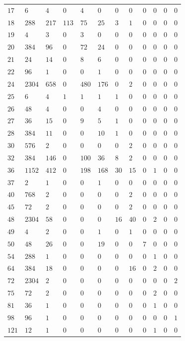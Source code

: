\documentclass[12pt]{amsart}
\numberwithin{equation}{section}
\theoremstyle{plain}
\theoremstyle{definition}
\theoremstyle{remark}
\begin{document}
\begin{longtable}{llllllllllll}
$17$ & $6$ & $4$ & $0$ & $4$ & $0$ & $0$ & $0$ & $0$ & $0$ & $0$ & $0$\\
$18$ & $288$ & $217$ & $113$ & $75$ & $25$ & $3$ & $1$ & $0$ & $0$ & $0$ & $0$\\
$19$ & $4$ & $3$ & $0$ & $3$ & $0$ & $0$ & $0$ & $0$ & $0$ & $0$ & $0$\\
$20$ & $384$ & $96$ & $0$ & $72$ & $24$ & $0$ & $0$ & $0$ & $0$ & $0$ & $0$\\
$21$ & $24$ & $14$ & $0$ & $8$ & $6$ & $0$ & $0$ & $0$ & $0$ & $0$ & $0$\\
$22$ & $96$ & $1$ & $0$ & $0$ & $1$ & $0$ & $0$ & $0$ & $0$ & $0$ & $0$\\
$24$ & $2304$ & $658$ & $0$ & $480$ & $176$ & $0$ & $2$ & $0$ & $0$ & $0$ & $0$\\
$25$ & $6$ & $4$ & $1$ & $1$ & $1$ & $1$ & $0$ & $0$ & $0$ & $0$ & $0$\\
$26$ & $48$ & $4$ & $0$ & $0$ & $4$ & $0$ & $0$ & $0$ & $0$ & $0$ & $0$\\
$27$ & $36$ & $15$ & $0$ & $9$ & $5$ & $1$ & $0$ & $0$ & $0$ & $0$ & $0$\\
$28$ & $384$ & $11$ & $0$ & $0$ & $10$ & $1$ & $0$ & $0$ & $0$ & $0$ & $0$\\
$30$ & $576$ & $2$ & $0$ & $0$ & $0$ & $0$ & $2$ & $0$ & $0$ & $0$ & $0$\\
$32$ & $384$ & $146$ & $0$ & $100$ & $36$ & $8$ & $2$ & $0$ & $0$ & $0$ & $0$\\
$36$ & $1152$ & $412$ & $0$ & $198$ & $168$ & $30$ & $15$ & $0$ & $1$ & $0$ & $0$\\
$37$ & $2$ & $1$ & $0$ & $0$ & $1$ & $0$ & $0$ & $0$ & $0$ & $0$ & $0$\\
$40$ & $768$ & $2$ & $0$ & $0$ & $0$ & $0$ & $2$ & $0$ & $0$ & $0$ & $0$\\
$45$ & $72$ & $2$ & $0$ & $0$ & $0$ & $0$ & $2$ & $0$ & $0$ & $0$ & $0$\\
$48$ & $2304$ & $58$ & $0$ & $0$ & $0$ & $16$ & $40$ & $0$ & $2$ & $0$ & $0$\\
$49$ & $4$ & $2$ & $0$ & $0$ & $1$ & $0$ & $1$ & $0$ & $0$ & $0$ & $0$\\
$50$ & $48$ & $26$ & $0$ & $0$ & $19$ & $0$ & $0$ & $7$ & $0$ & $0$ & $0$\\
$54$ & $288$ & $1$ & $0$ & $0$ & $0$ & $0$ & $0$ & $0$ & $1$ & $0$ & $0$\\
$64$ & $384$ & $18$ & $0$ & $0$ & $0$ & $0$ & $16$ & $0$ & $2$ & $0$ & $0$\\
$72$ & $2304$ & $2$ & $0$ & $0$ & $0$ & $0$ & $0$ & $0$ & $0$ & $0$ & $2$\\
$75$ & $72$ & $2$ & $0$ & $0$ & $0$ & $0$ & $0$ & $0$ & $2$ & $0$ & $0$\\
$81$ & $36$ & $1$ & $0$ & $0$ & $0$ & $0$ & $0$ & $0$ & $1$ & $0$ & $0$\\
$98$ & $96$ & $1$ & $0$ & $0$ & $0$ & $0$ & $0$ & $0$ & $0$ & $0$ & $1$\\
$121$ & $12$ & $1$ & $0$ & $0$ & $0$ & $0$ & $0$ & $0$ & $1$ & $0$ & $0$\\
\bottomrule
\end{longtable}
\end{document}
